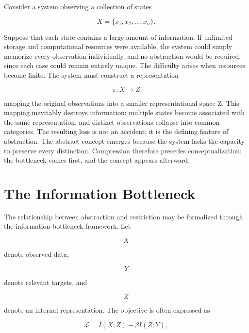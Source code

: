 \documentclass[11pt,oneside]{book}
\theoremstyle{plain}
\theoremstyle{definition}
\theoremstyle{remark}
\begin{document}
Consider a system observing a collection of states

\begin{equation}
X = \{x_1,x_2,\ldots,x_n\}.
\end{equation}

Suppose that each state contains a large amount of information. If unlimited storage and computational resources were available, the system could simply memorize every observation individually, and no abstraction would be required, since each case could remain entirely unique. The difficulty arises when resources become finite. The system must construct a representation

\begin{equation}
\pi : X
\rightarrow Z
\end{equation}

mapping the original observations into a smaller representational space Z. This mapping inevitably destroys information: multiple states become associated with the same representation, and distinct observations collapse into common categories. The resulting loss is not an accident; it is the defining feature of abstraction. The abstract concept emerges because the system lacks the capacity to preserve every distinction. Compression therefore precedes conceptualization: the bottleneck comes first, and the concept appears afterward.

\section{The Information Bottleneck}

The relationship between abstraction and restriction may be formalized through the information bottleneck framework. Let

\begin{equation}
X
\end{equation}

denote observed data,

\begin{equation}
Y
\end{equation}

denote relevant targets, and

\begin{equation}
Z
\end{equation}

denote an internal representation. The objective is often expressed as

\begin{equation}
\mathcal{L}
=
I(X;Z)
-
\beta I(Z;Y),
\end{equation}
\end{document}
